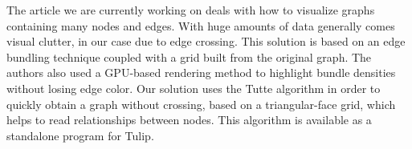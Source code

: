 The article we are currently working on deals with how to visualize graphs containing many nodes and edges. With huge amounts of data generally comes visual clutter, in our case due to edge crossing. This solution is based on an edge bundling technique coupled with a grid built from the original graph. The authors also used a GPU-based rendering method to highlight bundle densities without losing edge color. Our solution uses the Tutte algorithm in order to quickly obtain a graph without crossing, based on a triangular-face grid, which helps to read relationships between nodes. This algorithm is available as a standalone program for Tulip. 

